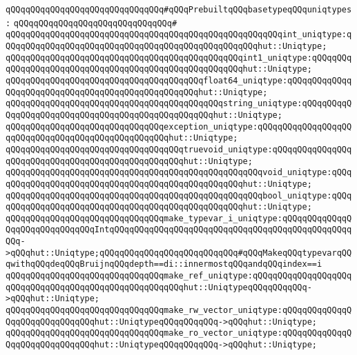 \newline
\verb|qQQqqQQqqQQqqQQqqQQqqQQqqQQqqQQq#qQQqPrebuiltqQQqbasetypeqQQquniqtypes:|\newline
\verb|qQQqqQQqqQQqqQQqqQQqqQQqqQQqqQQq#|\newline
\verb|qQQqqQQqqQQqqQQqqQQqqQQqqQQqqQQqqQQqqQQqqQQqqQQqqQQqqQQqint_uniqtype:qQQqqQQqqQQqqQQqqQQqqQQqqQQqqQQqqQQqqQQqqQQqqQQqqQQqhut::Uniqtype;|\newline
\verb|qQQqqQQqqQQqqQQqqQQqqQQqqQQqqQQqqQQqqQQqqQQqqQQqint1_uniqtype:qQQqqQQqqQQqqQQqqQQqqQQqqQQqqQQqqQQqqQQqqQQqqQQqqQQqqQQqhut::Uniqtype;|\newline
\verb|qQQqqQQqqQQqqQQqqQQqqQQqqQQqqQQqqQQqqQQqfloat64_uniqtype:qQQqqQQqqQQqqQQqqQQqqQQqqQQqqQQqqQQqqQQqqQQqqQQqqQQqhut::Uniqtype;|\newline
\verb|qQQqqQQqqQQqqQQqqQQqqQQqqQQqqQQqqQQqqQQqqQQqstring_uniqtype:qQQqqQQqqQQqqQQqqQQqqQQqqQQqqQQqqQQqqQQqqQQqqQQqqQQqhut::Uniqtype;|\newline
\verb|qQQqqQQqqQQqqQQqqQQqqQQqqQQqqQQqexception_uniqtype:qQQqqQQqqQQqqQQqqQQqqQQqqQQqqQQqqQQqqQQqqQQqqQQqqQQqhut::Uniqtype;|\newline
\verb|qQQqqQQqqQQqqQQqqQQqqQQqqQQqqQQqqQQqtruevoid_uniqtype:qQQqqQQqqQQqqQQqqQQqqQQqqQQqqQQqqQQqqQQqqQQqqQQqqQQqhut::Uniqtype;|\newline
\verb|qQQqqQQqqQQqqQQqqQQqqQQqqQQqqQQqqQQqqQQqqQQqqQQqqQQqvoid_uniqtype:qQQqqQQqqQQqqQQqqQQqqQQqqQQqqQQqqQQqqQQqqQQqqQQqqQQqhut::Uniqtype;|\newline
\verb|qQQqqQQqqQQqqQQqqQQqqQQqqQQqqQQqqQQqqQQqqQQqqQQqqQQqbool_uniqtype:qQQqqQQqqQQqqQQqqQQqqQQqqQQqqQQqqQQqqQQqqQQqqQQqqQQqhut::Uniqtype;|\newline
\newline
\verb|qQQqqQQqqQQqqQQqqQQqqQQqqQQqqQQqmake_typevar_i_uniqtype:qQQqqQQqqQQqqQQqqQQqqQQqqQQqqQQqIntqQQqqQQqqQQqqQQqqQQqqQQqqQQqqQQqqQQqqQQqqQQqqQQqqQQq->qQQqhut::Uniqtype;qQQqqQQqqQQqqQQqqQQqqQQqqQQq#qQQqMakeqQQqtypevarqQQqwithqQQqdeqQQqBruijnqQQqdepth==di::innermostqQQqandqQQqindex==i|\newline
\verb|qQQqqQQqqQQqqQQqqQQqqQQqqQQqqQQqmake_ref_uniqtype:qQQqqQQqqQQqqQQqqQQqqQQqqQQqqQQqqQQqqQQqqQQqqQQqqQQqqQQqhut::UniqtypeqQQqqQQqqQQq->qQQqhut::Uniqtype;|\newline
\verb|qQQqqQQqqQQqqQQqqQQqqQQqqQQqqQQqmake_rw_vector_uniqtype:qQQqqQQqqQQqqQQqqQQqqQQqqQQqqQQqhut::UniqtypeqQQqqQQqqQQq->qQQqhut::Uniqtype;|\newline
\verb|qQQqqQQqqQQqqQQqqQQqqQQqqQQqqQQqmake_ro_vector_uniqtype:qQQqqQQqqQQqqQQqqQQqqQQqqQQqqQQqhut::UniqtypeqQQqqQQqqQQq->qQQqhut::Uniqtype;|\newline
